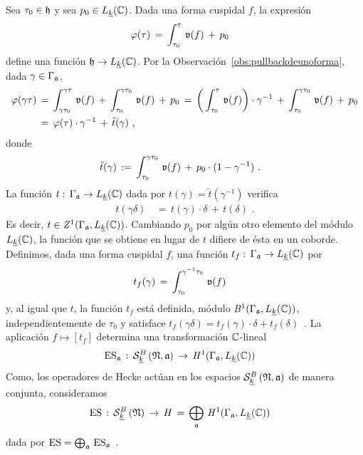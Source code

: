Sea $\tau_{0}\in\hP$ y sea $p_{0}\in L_{\peso{k}}(\bb{C})$. Dada una forma
cuspidal $f$, la expresi\'{o}n
\begin{align*}
	\varphi(\tau) & \,=\,\int_{\tau_{0}}^{\tau}\,\frak{v}(f)\,+\,p_{0}
\end{align*}
%
define una funci\'{o}n $\hP\rightarrow L_{\peso{k}}(\bb{C})$. Por la
Observaci\'{o}n~\ref{obs:pullbackdeunoforma}, dada
$\gamma\in\Gamma_{\frak{a}}$,
\begin{align*}
	\varphi(\gamma\tau) & \,=\,\int_{\gamma\tau_{0}}^{\gamma\tau}\,
		\frak{v}(f)\,+\,\int_{\tau_{0}}^{\gamma\tau_{0}}\,\frak{v}(f)
		\,+\,p_{0} \,=\,
		\bigg(\int_{\tau_{0}}^{\tau}\,\frak{v}(f)\bigg)\cdot\gamma^{-1}
		\,+\,\int_{\tau_{0}}^{\gamma\tau_{0}}\,\frak{v}(f)\,+\,p_{0} \\
	& \,=\,	\varphi(\tau)\cdot\gamma^{-1}\,+\,\tilde{t}(\gamma)
	\text{ ,}
\end{align*}
%
donde
\begin{align*}
	\tilde{t}(\gamma) & \,:=\,\int_{\tau_{0}}^{\gamma\tau_{0}}\,
		\frak{v}(f)\,+\,p_{0}\cdot(1-\gamma^{-1})
	\text{ .}
\end{align*}
%
La funci\'{o}n
\begin{math}
	t:\,\Gamma_{\frak{a}}\rightarrow L_{\peso{k}}(\bb{C})
\end{math}
dada por $t(\gamma)=\tilde{t}(\gamma^{-1})$ verifica
\begin{align*}
	t(\gamma\delta) & \,=\,t(\gamma)\cdot\delta\,+\,t(\delta)
	\text{ .}
\end{align*}
%
Es decir, $t\in\cociclos[1]{\Gamma_{\frak{a}},L_{\peso{k}}(\bb{C})}$. Cambiando
$p_{0}$ por alg\'{u}n otro elemento del m\'{o}dulo $L_{\peso{k}}(\bb{C})$, la
funci\'{o}n que se obtiene en lugar de $t$ difiere de \'{e}sta en un coborde.
Definimos, dada una forma cuspidal $f$, una funci\'{o}n
$t_{f}:\,\Gamma_{\frak{a}}\rightarrow L_{\peso{k}}(\bb{C})$ por
\begin{align*}
	t_{f}(\gamma) & \,=\,\int_{\tau_{0}}^{\gamma^{-1}\tau_{0}}\,\frak{v}(f)
\end{align*}
%
y, al igual que $t$, la funci\'{o}n $t_{f}$ est\'{a} definida, m\'{o}dulo
$\cobordes[1]{\Gamma_{\frak{a}},L_{\peso{k}}(\bb{C})}$,
independientemente de $\tau_{0}$ y satisface
\begin{math}
	t_{f}(\gamma\delta)=t_{f}(\gamma)\cdot\delta+t_{f}(\delta)
\end{math}~.
La aplicaci\'{o}n $f\mapsto [t_{f}]$ determina una transformaci\'{o}n
$\bb{C}$-lineal
\begin{align*}
	& \ES_{\frak{a}} \,:\,\spitzH[B]{k}{\frak{N},\frak{a}} \,\rightarrow\,
		\cohomolo[1]{\Gamma_{\frak{a}},L_{\peso{k}}(\bb{C})}
\end{align*}
%
Como, los operadores de Hecke act\'{u}an en los espacios
$\spitzH[B]{k}{\frak{N},\frak{a}}$ de manera conjunta, consideramos
\begin{align*}
	& \ES \,:\,\spitzH[B]{k}{\frak{N}}\,\rightarrow\, H\,=\,
		\bigoplus_{\frak{a}}\,
			\cohomolo[1]{\Gamma_{\frak{a}},L_{\peso{k}}(\bb{C})}
\end{align*}
%
dada por
\begin{math}
	\ES =\bigoplus_{\frak{a}}\,\ES_{\frak{a}}
\end{math}~.

